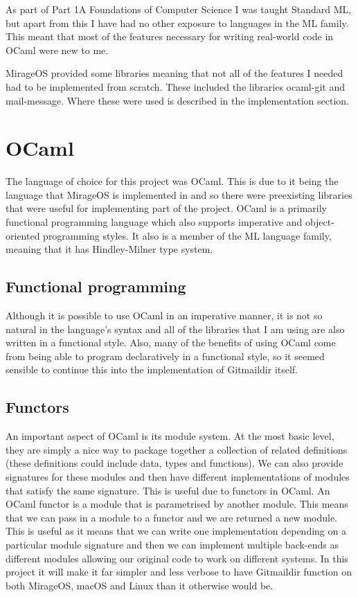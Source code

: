 As part of Part 1A Foundations of Computer Science I was taught Standard ML, but apart from this I have had no other exposure to languages in the ML family. This meant that most of the features necessary for writing real-world code in OCaml were new to me.

MirageOS provided some libraries meaning that not all of the features I needed had to be implemented from scratch. These included the libraries ocaml-git and mail-message. Where these were used is described in the implementation section.

\section{OCaml}

The language of choice for this project was OCaml\cite{code_ocaml}. This is due to it being the language that MirageOS is implemented in and so there were preexisting libraries that were useful for implementing part of the project. OCaml is a primarily functional programming language which also supports imperative and object-oriented programming styles. It also is a member of the ML language family, meaning that it has Hindley-Milner type system.

\subsection{Functional programming}

Although it is possible to use OCaml in an imperative manner, it is not so natural in the language's syntax and all of the libraries that I am using are also written in a functional style. Also, many of the benefits of using OCaml come from being able to program declaratively in a functional style, so it seemed sensible to continue this into the implementation of Gitmaildir itself.

\subsection{Functors}

An important aspect of OCaml is its module system. At the most basic level, they are simply a nice way to package together a collection of related definitions (these definitions could include data, types and functions). We can also provide signatures for these modules and then have different implementations of modules that satisfy the same signature. This is useful due to functors in OCaml. An OCaml functor is a module that is parametrised by another module. This means that we can pass in a module to a functor and we are returned a new module. This is useful as it means that we can write one implementation depending on a particular module signature and then we can implement multiple back-ends as different modules allowing our original code to work on different systems. In this project it will make it far simpler and less verbose to have Gitmaildir function on both MirageOS, macOS and Linux than it otherwise would be.

